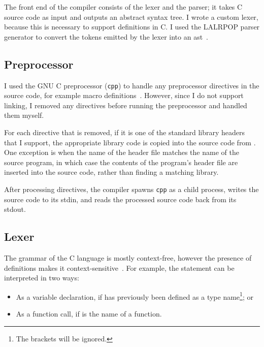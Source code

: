 \documentclass[00-main.tex]{subfiles}
\begin{document}
The front end of the compiler consists of the lexer and the parser; it takes C source code as input and outputs an abstract syntax tree.
I wrote a custom lexer, because this is necessary to support  definitions in C\@.
I used the LALRPOP parser generator to convert the tokens emitted by the lexer into an \gls{ast}~.

\subsection{Preprocessor}

I used the GNU C preprocessor (\texttt{cpp}) to handle any preprocessor directives in the source code, for example macro definitions~.
However, since I do not support linking, I removed any  directives before running the preprocessor and handled them myself.

For each  directive that is removed, if it is one of the standard library headers that I support, the appropriate library code is copied into the source code from .
One exception is when the name of the header file matches the name of the source program, in which case the contents of the program's header file are inserted into the source code, rather than finding a matching library.

After processing  directives, the compiler spawns \texttt{cpp} as a child process, writes the source code to its stdin, and reads the processed source code back from its stdout.

\subsection{Lexer}\label{sec:impl:lexer}

The grammar of the C language is mostly context-free, however the presence of  definitions makes it context-sensitive~.
For example, the statement  can be interpreted in two ways:
\begin{itemize}
\item As a variable declaration, if  has previously been defined as a type name\footnote{The brackets will be ignored.}; or
\item As a function call, if  is the name of a function.
\end{itemize}
\end{document}
